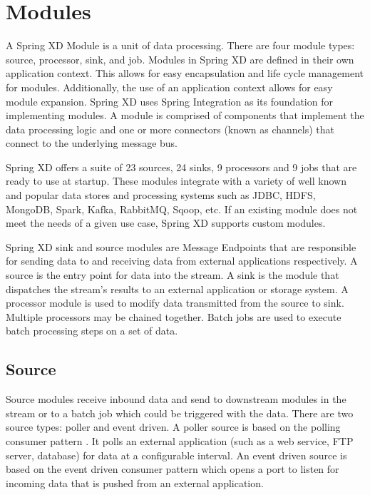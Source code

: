 \section{Modules}
\label{sec:Modules}
A Spring XD Module \cite{modules} is a unit of data processing. There are four module
types: source, processor, sink, and job. Modules in Spring XD are defined
in their own application context. This allows for easy encapsulation and life cycle
management for modules. Additionally, the use of an application context allows for easy
module expansion.  Spring XD uses Spring Integration \cite{spring-integration-reference}
as its foundation for implementing modules. A module is comprised of components that
implement the data processing logic and one or more connectors (known as channels)
that connect to the underlying message bus.

\par

Spring XD offers a suite of 23 sources, 24 sinks, 9 processors and 9 jobs that are ready
to use at startup.  These modules integrate with a variety of well known and popular
data stores and processing systems such as JDBC, HDFS, MongoDB, Spark, Kafka, RabbitMQ,
Sqoop, etc.  If an existing module does not meet the needs of a given use case, Spring XD
supports custom modules.

Spring XD sink and source modules are Message Endpoints
\cite{enterprise-integration-pattern-message-endpoint}
that are responsible for sending data to and receiving data from external applications
respectively. A source is the entry point for data into the stream. A sink is
the module that dispatches the stream's results to an external application or storage system.
A processor module is used to modify data transmitted from the source to sink.
Multiple processors may be chained together. Batch jobs are used to execute batch
processing steps on a set of data.

\par

\subsection{Source}
\label{sec:Source}
Source modules receive inbound data and send to downstream modules in the stream or to a batch job
which could be triggered with the data. There are two source types: poller and event driven.
A poller source is based on the polling consumer pattern \cite{enterprise-integration-pattern-pollingconsumer}.
It polls an external application (such as a web service, FTP server, database) for data at a
configurable interval. An event driven source is based on the event driven
consumer pattern \cite{enterprise-integration-pattern-eventdrivenconsumer} which
opens a port to listen for incoming data that is pushed from an external application.

